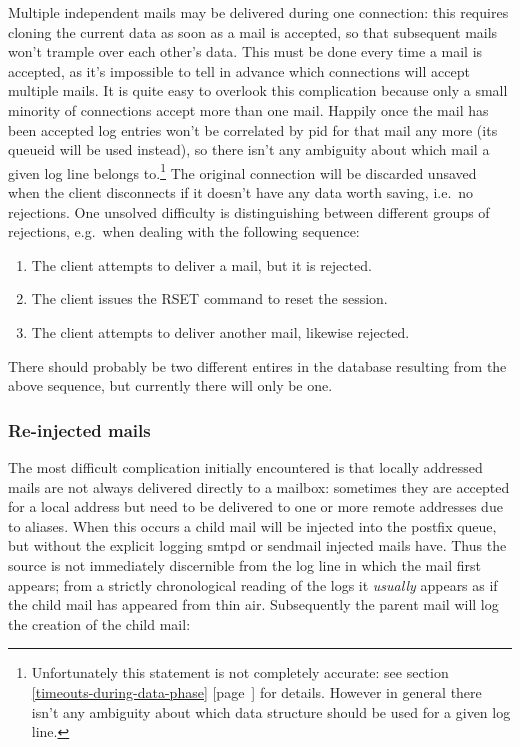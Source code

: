\documentclass[a4paper,12pt,draft]{article}
\newcommand{\refwithpage}[1]{%
    \empty{}\ref{#1} [page~\pageref{#1}]%
}
\begin{document}
Multiple independent mails may be delivered during one connection: this
requires cloning the current data as soon as a mail is accepted, so that
subsequent mails won't trample over each other's data.  This must be done
every time a mail is accepted, as it's impossible to tell in advance which
connections will accept multiple mails.  It is quite easy to overlook this
complication because only a small minority of connections accept more than
one mail. Happily once the mail has been accepted log entries won't be
correlated by pid for that mail any more (its queueid will be used
instead), so there isn't any ambiguity about which mail a given log line
belongs to.\footnote{Unfortunately this statement is not completely
accurate: see section~\refwithpage{timeouts-during-data-phase} for details.
However in general there isn't any ambiguity about which data structure
should be used for a given log line.}  The original connection will be
discarded unsaved when the client disconnects if it doesn't have any data
worth saving, i.e.\ no rejections.  One unsolved difficulty is
distinguishing between different groups of rejections, e.g.\ when dealing
with the following sequence:

\begin{enumerate}

    \item The client attempts to deliver a mail, but it is rejected.

    \item The client issues the RSET command to reset the session.

    \item The client attempts to deliver another mail, likewise rejected.

\end{enumerate}

There should probably be two different entires in the database resulting
from the above sequence, but currently there will only be one.



\subsubsection{Re-injected mails}

The most difficult complication initially encountered is that locally
addressed mails are not always delivered directly to a mailbox: sometimes
they are accepted for a local address but need to be delivered to one or
more remote addresses due to aliases.  When this occurs a child mail will
be injected into the postfix queue, but without the explicit logging smtpd
or sendmail injected mails have.  Thus the source is not immediately
discernible from the log line in which the mail first appears; from a
strictly chronological reading of the logs it \textit{usually\/} appears as
if the child mail has appeared from thin air.  Subsequently the parent mail
will log the creation of the child mail:
\end{document}
